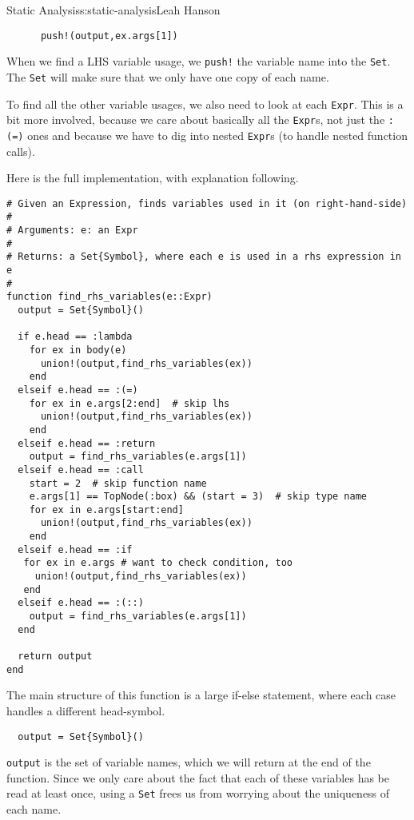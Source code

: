 \begin{aosachapter}{Static Analysis}{s:static-analysis}{Leah Hanson}
\begin{verbatim}
      push!(output,ex.args[1])
\end{verbatim}

When we find a LHS variable usage, we \texttt{push!} the variable name
into the \texttt{Set}. The \texttt{Set} will make sure that we only have
one copy of each name.

\label{finding-rhs-usages}

To find all the other variable usages, we also need to look at each
\texttt{Expr}. This is a bit more involved, because we care about
basically all the \texttt{Expr}s, not just the \texttt{:(=)} ones and
because we have to dig into nested \texttt{Expr}s (to handle nested
function calls).

Here is the full implementation, with explanation following.

\begin{verbatim}
# Given an Expression, finds variables used in it (on right-hand-side)
#
# Arguments: e: an Expr
#
# Returns: a Set{Symbol}, where each e is used in a rhs expression in e
#
function find_rhs_variables(e::Expr)
  output = Set{Symbol}()

  if e.head == :lambda
    for ex in body(e)
      union!(output,find_rhs_variables(ex))
    end
  elseif e.head == :(=)
    for ex in e.args[2:end]  # skip lhs
      union!(output,find_rhs_variables(ex))
    end
  elseif e.head == :return
    output = find_rhs_variables(e.args[1])
  elseif e.head == :call
    start = 2  # skip function name
    e.args[1] == TopNode(:box) && (start = 3)  # skip type name
    for ex in e.args[start:end]
      union!(output,find_rhs_variables(ex))
    end
  elseif e.head == :if
   for ex in e.args # want to check condition, too
     union!(output,find_rhs_variables(ex))
   end
  elseif e.head == :(::)
    output = find_rhs_variables(e.args[1])
  end

  return output
end
\end{verbatim}

The main structure of this function is a large if-else statement, where
each case handles a different head-symbol.

\begin{verbatim}
  output = Set{Symbol}()
\end{verbatim}

\texttt{output} is the set of variable names, which we will return at
the end of the function. Since we only care about the fact that each of
these variables has be read at least once, using a \texttt{Set} frees us
from worrying about the uniqueness of each name.


\end{aosachapter}
